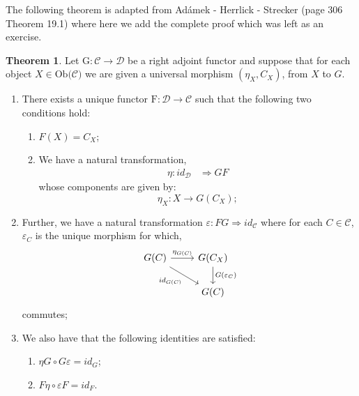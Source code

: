 \documentclass[11pt,a4paper]{article}
\theoremstyle{definition}
\newtheorem{thm}{Theorem}[section]
\newcommand\ob[1]{\mathrm{Ob(}#1\mathrm{)}}
\newcommand\cat[1]{\mathscr{#1}}
\newcommand\func[3]{\mathrm{#1}\colon#2\rightarrow#3}
\newcommand\nattran[3]{#1\colon#2\Rightarrow#3}
\numberwithin{equation}{section}
\begin{document}
The following theorem is adapted from Adámek - Herrlick - Strecker \cite{ACC} (page 306 Theorem 19.1) where here we add the complete proof which was left as an exercise.
\begin{thm}
    \label{thm:adjsituation}
    Let $\func{G}{\cat{C}}{\cat{D}}$ be a right adjoint functor and suppose that for each object $X\in\ob{\cat{C}}$ we are given a universal morphism $(\eta_{X},C_{X})$, from $X$ to $G$. 
    \begin{enumerate}
    
  \item  There exists a unique functor $\func{F}{\cat{D}}{\cat{C}}$ such that the following two conditions hold:
    \begin{enumerate}
    \item $F(X) = C_{X}$;
    \item We have a natural transformation, \begin{align*}
        \nattran{\eta}{id_{\cat{D}}&}{GF}%
    \end{align*}
whose components are given by:
        \[\eta_X\colon X \to G(C_X);\]
    
    \end{enumerate}
   \item  Further, we have a natural transformation $\nattran{\varepsilon}{FG}{id_{\cat{C}}}$ where for each $C\in\cat{C}$, $\varepsilon_{C}$ is the unique morphism for which,
    \begin{equation}
    \label{eqn:counitdef}
    \begin{tikzcd}
    G(C) \arrow[r, "\eta_{G(C)}"] \arrow[dr, "id_{G(C)}"'] & G(C_{X}) \arrow[d, "G(\varepsilon_{C})"] \\
    & G(C)
    \end{tikzcd}
    \end{equation}
commutes;

\item We also have that the following identities are satisfied:
    \begin{enumerate}
        \item $\eta G \circ G\varepsilon = id_{G}$;
        \item $F\eta \circ \varepsilon F = id_{F}$.
    \end{enumerate}
\end{enumerate}
\end{thm}
\end{document}
